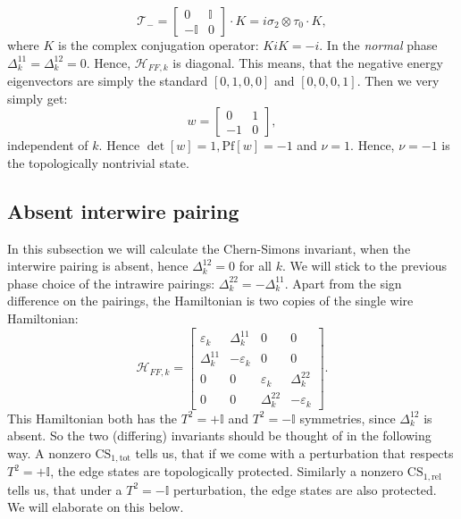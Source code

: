 \begin{equation}
\mathcal{T}_- = \begin{bmatrix} 0 & \mathbb{I} \\ -\mathbb{I} & 0 \end{bmatrix}\cdot K = i\sigma_2\otimes \tau_0 \cdot K,
\label{eq.2wires.T-.1quant} 
\end{equation}
where $K$ is the complex conjugation operator: $KiK = -i$. In the \textit{normal} phase $\Delta^{11}_k = \Delta^{12}_k = 0$. Hence, $\mathcal{H}_{FF,k}$ is diagonal. This means, that the negative energy eigenvectors are simply the standard $[0, 1, 0, 0]$ and $[0, 0, 0, 1]$. Then we very simply get:
\begin{equation}
w = \begin{bmatrix} 0 & 1 \\ -1 & 0 \end{bmatrix}, \nonumber
\end{equation}
independent of $k$. Hence $\det[w] = 1, \text{Pf}[w] = -1$ and $\nu = 1$. Hence, $\nu = -1$ is the topologically nontrivial state. 


\subsection{Absent interwire pairing}
\label{subsec.2wires_CSinvDelta12eq0}
In this subsection we will calculate the Chern-Simons invariant, when the interwire pairing is absent, hence $\Delta^{12}_k = 0$ for all $k$. We will stick to the previous phase choice of the intrawire pairings: $\Delta^{22}_k = -\Delta^{11}_k$. Apart from the sign difference on the pairings, the Hamiltonian is two copies of the single wire Hamiltonian:
\begin{equation}
\mathcal{H}_{FF,k} = \begin{bmatrix} 
\varepsilon_k & \Delta^{11}_k & 0 & 0  \\
\Delta^{11}_k & -\varepsilon_k & 0 & 0 \\ 
0 & 0 & \varepsilon_k & \Delta^{22}_k  \\ 
0 & 0 & \Delta^{22}_k & -\varepsilon_k
\end{bmatrix}. \nonumber
\end{equation}
This Hamiltonian both has the $T^2 = + \mathbb{I}$ and $T^2 = -\mathbb{I}$ symmetries, since $\Delta^{12}_k$ is absent. So the two (differing) invariants should be thought of in the following way. A nonzero $\text{CS}_{1,\text{tot}}$ tells us, that if we come with a perturbation that respects $T^2 = +\mathbb{I}$, the edge states are topologically protected. Similarly a nonzero $\text{CS}_{1,\text{rel}}$ tells us, that under a $T^2 = -\mathbb{I}$ perturbation, the edge states are also protected. We will elaborate on this below. 

